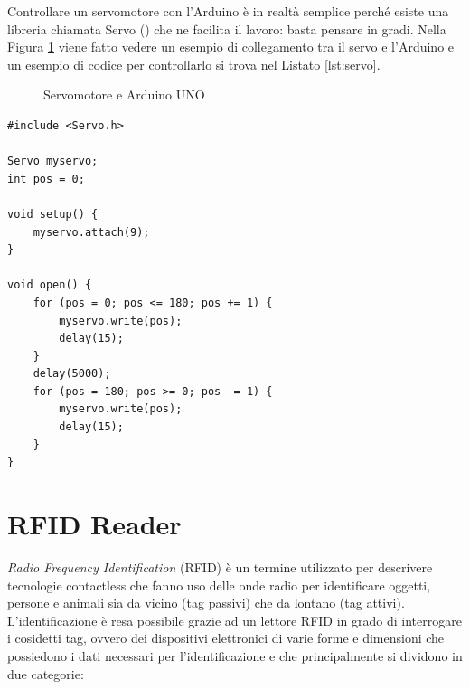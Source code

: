 \documentclass[12pt]{report}
\begin{document}
Controllare un servomotore con l'Arduino è in realtà semplice perché esiste una libreria chiamata Servo (\cite{servo}) che ne facilita il lavoro: basta pensare in gradi. Nella Figura \ref{fig:servo_uno} viene fatto vedere un esempio di collegamento tra il servo e l'Arduino e un esempio di codice per controllarlo si trova nel Listato \ref{lst:servo}.

\begin{figure}[H]
	\caption{Servomotore e Arduino UNO}
	\label{fig:servo_uno}
\end{figure}

\begin{lstlisting}[caption={Esempio di codice per controllare il servomotore: innanzittutto il servo viene collegato al pin 9 dell'Arduino e viene fatto ruotare di 180 gradi da una parte (aprendo la porta); dopo 5 secondi viene fatto ruotare di 180 gradi dalla parte opposta}, label={lst:servo}]
#include <Servo.h>

Servo myservo;
int pos = 0;

void setup() {
	myservo.attach(9);
}

void open() {
	for (pos = 0; pos <= 180; pos += 1) {  
		myservo.write(pos);				 
		delay(15);                      
	}
	delay(5000);
	for (pos = 180; pos >= 0; pos -= 1) {  
		myservo.write(pos);				   
		delay(15);                        
	}
}
\end{lstlisting}

%
\section{RFID Reader}
%

\emph{Radio Frequency Identification} (RFID) è un termine utilizzato per descrivere tecnologie contactless che fanno uso delle onde radio per identificare oggetti, persone e animali sia da vicino (tag passivi) che da lontano (tag attivi). L'identificazione è resa possibile grazie ad un lettore RFID in grado di interrogare i cosidetti tag, ovvero dei dispositivi elettronici di varie forme e dimensioni che possiedono i dati necessari per l'identificazione e che principalmente si dividono in due categorie: 
\end{document}
